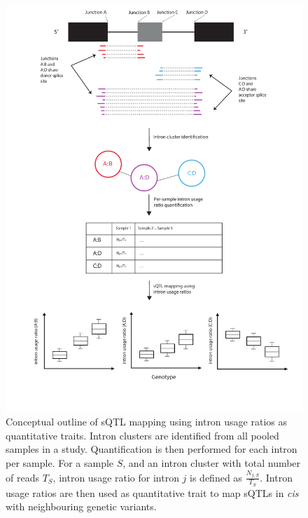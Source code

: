 \begin{figure}[H]
    \centering
    \includegraphics[width=\textwidth]{leafcutter_conceptual}
    \caption[Conceptual overview of splicing quantitative trait loci mapping using intron usage ratios]{Conceptual outline of sQTL mapping using intron usage ratios as quantitative traits. Intron clusters are identified from all pooled samples in a study. Quantification is then performed for each intron per sample. For a sample $S$, and an intron cluster with total number of reads $T_{S}$, intron usage ratio for intron $j$ is defined as $\frac{N_{j,S}}{T_{S}}$. Intron usage ratios are then used as quantitative trait to map sQTLs in \textit{cis} with neighbouring genetic variants.}
    \label{fig:leafcutter_conceptual}   
  \end{figure}

